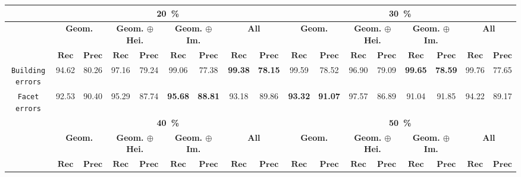         \begin{sidewaystable}[htbp]
            \footnotesize
            \centering
            \begin{tabular}{| c | c c | c c | c c | c c || c c | c c | c c | c c |}
                \hline
                & \multicolumn{8}{c||}{\textbf{\SI{20}{\percent}}} & \multicolumn{8}{c|}{\textbf{\SI{30}{\percent}}}\\
                \hline
                &\multicolumn{2}{c|}{\textbf{Geom.}} & \multicolumn{2}{c|}{\textbf{Geom. \(\oplus\) Hei.}} & \multicolumn{2}{c|}{\textbf{Geom. \(\oplus\) Im.}} & \multicolumn{2}{c||}{\textbf{All}} & \multicolumn{2}{c|}{\textbf{Geom.}} & \multicolumn{2}{c|}{\textbf{Geom. \(\oplus\) Hei.}} & \multicolumn{2}{c|}{\textbf{Geom. \(\oplus\) Im.}} & \multicolumn{2}{x{1.5cm}|}{\textbf{All}}\\
                \cline{2-17}
                & \(\bm{Rec}\) & \(\bm{Prec}\) &  \(\bm{Rec}\) & \(\bm{Prec}\) &  \(\bm{Rec}\) & \(\bm{Prec}\) &  \(\bm{Rec}\) & \(\bm{Prec}\) & \(\bm{Rec}\) & \(\bm{Prec}\) &  \(\bm{Rec}\) & \(\bm{Prec}\) &  \(\bm{Rec}\) & \(\bm{Prec}\) &  \(\bm{Rec}\) & \(\bm{Prec}\) \\
                \hline
                \texttt{Building errors} & 94.62 & 80.26 & 97.16 & 79.24 & 99.06 & 77.38 & \textbf{99.38} & \textbf{78.15} & 99.59 & 78.52 & 96.90 & 79.09 & \textbf{99.65} & \textbf{78.59} & 99.76 & 77.65 \\
                \hline
                \texttt{Facet errors} & 92.53 & 90.40 & 95.29 & 87.74 & \textbf{95.68} & \textbf{88.81} & 93.18 & 89.86 & \textbf{93.32} & \textbf{91.07} & 97.57 & 86.89 & 91.04 & 91.85 & 94.22 & 89.17 \\
                \hline
                \hline
                & \multicolumn{8}{c||}{\textbf{\SI{40}{\percent}}} & \multicolumn{8}{c|}{\textbf{\SI{50}{\percent}}}\\
                \hline
                &\multicolumn{2}{c|}{\textbf{Geom.}} & \multicolumn{2}{c|}{\textbf{Geom. \(\oplus\) Hei.}} & \multicolumn{2}{c|}{\textbf{Geom. \(\oplus\) Im.}} & \multicolumn{2}{c||}{\textbf{All}} & \multicolumn{2}{c|}{\textbf{Geom.}} & \multicolumn{2}{c|}{\textbf{Geom. \(\oplus\) Hei.}} & \multicolumn{2}{c|}{\textbf{Geom. \(\oplus\) Im.}} & \multicolumn{2}{x{1.5cm}|}{\textbf{All}}\\
                \cline{2-17}
                & \(\bm{Rec}\) & \(\bm{Prec}\) &  \(\bm{Rec}\) & \(\bm{Prec}\) &  \(\bm{Rec}\) & \(\bm{Prec}\) &  \(\bm{Rec}\) & \(\bm{Prec}\) & \(\bm{Rec}\) & \(\bm{Prec}\) &  \(\bm{Rec}\) & \(\bm{Prec}\) &  \(\bm{Rec}\) & \(\bm{Prec}\) &  \(\bm{Rec}\) & \(\bm{Prec}\) \\

\end{tabular}
\end{sidewaystable}
